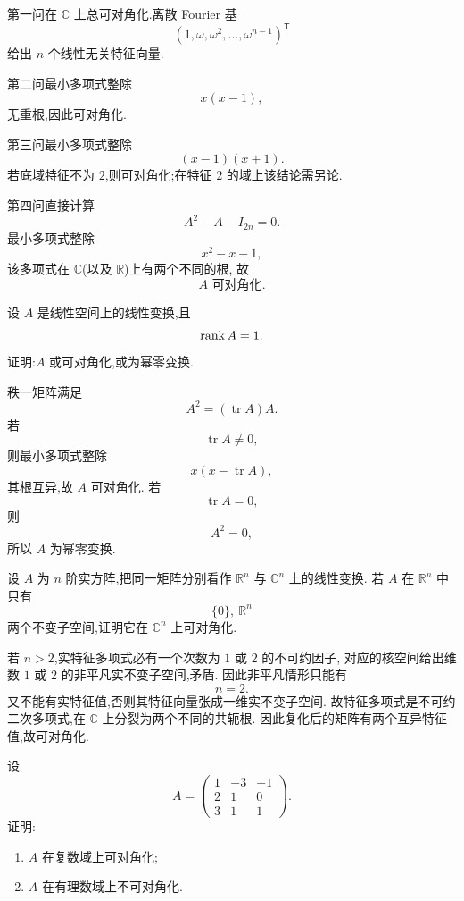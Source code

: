 \begin{solution}
第一问在 $\mathbb{C}$ 上总可对角化.离散 Fourier 基
\[
(1,\omega,\omega^2,\ldots,\omega^{n-1})^{\mathsf T}
\]
给出 $n$ 个线性无关特征向量.

第二问最小多项式整除
\[
x(x-1),
\]
无重根,因此可对角化.

第三问最小多项式整除
\[
(x-1)(x+1).
\]
若底域特征不为 $2$,则可对角化;在特征 $2$ 的域上该结论需另论.

第四问直接计算
\[
A^2-A-I_{2n}=0.
\]
最小多项式整除
\[
x^2-x-1,
\]
该多项式在 $\mathbb{C}$(以及 $\mathbb{R}$)上有两个不同的根,
故
\[
\boxed{A\text{ 可对角化}.}
\]
\end{solution}


\begin{example}
设 $A$ 是线性空间上的线性变换,且
\[
\operatorname{rank} A=1.
\]
证明:$A$ 或可对角化,或为幂零变换.
\end{example}
\exampleblank

\begin{solution}
秩一矩阵满足
\[
A^2=(\operatorname{tr}A)A.
\]
若
\[
\operatorname{tr}A\neq0,
\]
则最小多项式整除
\[
x(x-\operatorname{tr}A),
\]
其根互异,故 $A$ 可对角化.
若
\[
\operatorname{tr}A=0,
\]
则
\[
A^2=0,
\]
所以 $A$ 为幂零变换.
\end{solution}


\begin{example}
设 $A$ 为 $n$ 阶实方阵,把同一矩阵分别看作
$\mathbb{R}^n$ 与 $\mathbb{C}^n$ 上的线性变换.
若 $A$ 在 $\mathbb{R}^n$ 中只有
\[
\{0\},\ \mathbb{R}^n
\]
两个不变子空间,证明它在 $\mathbb{C}^n$ 上可对角化.
\end{example}
\exampleblank

\begin{solution}
若 $n>2$,实特征多项式必有一个次数为 $1$ 或 $2$ 的不可约因子,
对应的核空间给出维数 $1$ 或 $2$ 的非平凡实不变子空间,矛盾.
因此非平凡情形只能有
\[
n=2.
\]
又不能有实特征值,否则其特征向量张成一维实不变子空间.
故特征多项式是不可约二次多项式,在 $\mathbb{C}$ 上分裂为两个不同的共轭根.
因此复化后的矩阵有两个互异特征值,故可对角化.
\end{solution}


\begin{example}
设
\[
A=
\begin{pmatrix}
1&-3&-1\\
2&1&0\\
3&1&1
\end{pmatrix}.
\]
证明:
\begin{enumerate}
    \item $A$ 在复数域上可对角化;
    \item $A$ 在有理数域上不可对角化.
\end{enumerate}
\end{example}
\exampleblank

